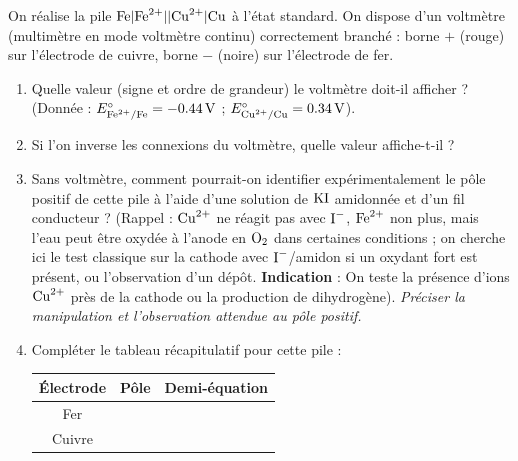 \documentclass[11pt]{article}
\begin{document}
\begin{exercice}
On réalise la pile $\ce{Fe}|\ce{Fe^{2+}}||\ce{Cu^{2+}}|\ce{Cu}$ à l'état standard. On dispose d'un voltmètre (multimètre en mode voltmètre continu) correctement branché : borne $+$ (rouge) sur l'électrode de cuivre, borne $-$ (noire) sur l'électrode de fer.
\begin{enumerate}
    \item Quelle valeur (signe et ordre de grandeur) le voltmètre doit-il afficher ? (Donnée : $E^\circ_{\ce{Fe^{2+}/Fe}} = \SI{-0,44}{V}$ ; $E^\circ_{\ce{Cu^{2+}/Cu}} = \SI{+0,34}{V}$).
    \item Si l'on inverse les connexions du voltmètre, quelle valeur affiche-t-il ?
    \item Sans voltmètre, comment pourrait-on identifier expérimentalement le pôle positif de cette pile à l'aide d'une solution de $\ce{KI}$ amidonnée et d'un fil conducteur ? (Rappel : $\ce{Cu^{2+}}$ ne réagit pas avec $\ce{I-}$, $\ce{Fe^{2+}}$ non plus, mais l'eau peut être oxydée à l'anode en $\ce{O2}$ dans certaines conditions ; on cherche ici le test classique sur la cathode avec $\ce{I-}$/amidon si un oxydant fort est présent, ou l'observation d'un dépôt. \textbf{Indication} : On teste la présence d'ions $\ce{Cu^{2+}}$ près de la cathode ou la production de dihydrogène). \textit{Préciser la manipulation et l'observation attendue au pôle positif.}
    \item Compléter le tableau récapitulatif pour cette pile :
    \begin{center}
    \begin{tabular}{|c|c|c|}
    \hline
    \textbf{Électrode} & \textbf{Pôle} & \textbf{Demi-équation} \\
    \hline
    Fer & & \\
    \hline
    Cuivre & & \\
    \hline
    \end{tabular}
    \end{center}
\end{enumerate}
\end{exercice}
\end{document}
